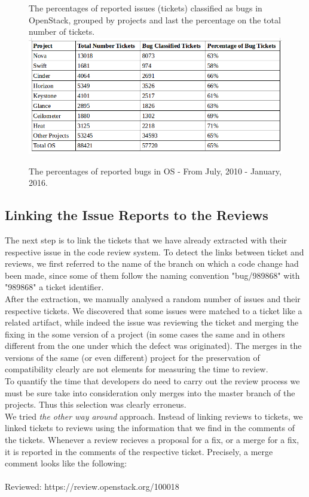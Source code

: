 \documentclass[ifip]{svmult}
\begin{document}
\begin{figure}[H]
\centering
 The percentages of reported issues (tickets) classified as bugs in OpenStack, grouped by projects and last the percentage 
 on the total number of tickets.
\includegraphics[width=1.0\textwidth,natwidth=786,natheight=360]{bugs_time.png}

\caption{The percentages of reported bugs in OS - From July, 2010 - January, 2016.}
\label{fig:1}       %
\end{figure}


\subsection{Linking the Issue Reports to the Reviews}
\label{sec:4.2}

The next step is to link the tickets that we have already extracted with their respective issue in the code review system.
To detect the links between ticket and reviews, we first referred to the name of the branch on which a code change had 
been made, since some of them follow the naming convention "bug/989868" with "989868" a ticket identifier.
\\
After the extraction, we manually analysed a random number of issues and their respective tickets. We discovered 
that some issues were matched to a ticket like a related artifact, while indeed the issue was reviewing the ticket and 
merging the fixing in the some version of a project (in some cases the same and in others different 
from the one under which the defect was originated). 
The merges in the versions of the same (or even different) project for the preservation of compatibility clearly 
are not elements for measuring the time to review.
\\
To quantify the time that developers do need to carry out the review process
we must be sure take into consideration only merges into the master branch of the projects. 
Thus this selection was clearly erroneus.
\\
We tried \textit{the other way around} approach. Instead of linking reviews to tickets, we linked tickets to reviews using the information
that we find in the comments of the tickets. Whenever a review recieves a proposal for a fix, or a merge for a fix, it is reported in the 
comments of the respective ticket. 
Precisely, a merge comment looks like the following:  
\\
\\
Reviewed:  https://review.openstack.org/100018
\end{document}
